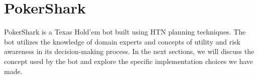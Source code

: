 \chapter{PokerShark}
\label{chap:PokerShark}

PokerShark is a Texas Hold'em bot built using HTN planning techniques. The bot utilizes the knowledge of domain experts and concepts of utility and risk awareness in its decision-making process. In the next sections, we will discuss the concept used by the bot and explore the specific implementation choices we have made.












